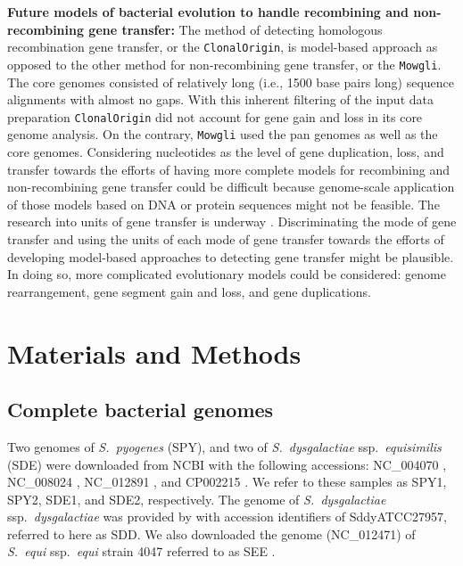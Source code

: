 \documentclass[english]{article}
\begin{document}
\textbf{Future models of bacterial evolution to handle recombining and
non-recombining gene transfer:}
The method of detecting homologous recombination gene transfer, or the
\texttt{ClonalOrigin}, is model-based approach as opposed to the other method
for non-recombining gene transfer, or the \texttt{Mowgli}.  The core genomes consisted of
relatively long (i.e., 1500 base pairs long) sequence alignments with almost no
gaps. With this inherent filtering of the input data preparation
\texttt{ClonalOrigin} did not account for gene gain and loss in its core genome
analysis. On the contrary, \texttt{Mowgli} used the pan genomes as well as the core
genomes.  Considering nucleotides as the level of gene duplication, loss, and
transfer towards the efforts of having more complete models for recombining and
non-recombining gene transfer could be difficult because genome-scale
application of those models based on DNA or protein sequences might not be
feasible.  The research into units of gene transfer is underway
\citep[e.g.,][]{Chan2009a}. Discriminating the mode of gene transfer and using
the units of each mode of gene transfer towards the efforts of developing
model-based approaches to detecting gene transfer might be plausible. In doing
so, more complicated evolutionary models could be considered: genome
rearrangement, gene segment gain and loss, and gene duplications. 


\section{Materials and Methods}

\subsection{Complete bacterial genomes}

Two genomes of \textit{S.\ pyogenes} (SPY), and two of \textit{S.\ dysgalactiae}
ssp.\textit{\ equisimilis} (SDE) were downloaded from NCBI with the following
accessions: NC\_004070 \citep{Beres2002}, NC\_008024 \citep{Beres2006},
NC\_012891 \citep{Shimomura2011}, and CP002215 \citep{Suzuki2011}. We refer to
these samples as SPY1, SPY2, SDE1, and SDE2, respectively. The genome of
\textit{S.\ dysgalactiae} ssp.\textit{\ dysgalactiae} was provided by
\citet{Suzuki2011} with accession identifiers of SddyATCC27957, referred to here
as SDD. We also downloaded the genome (NC\_012471) of \textit{S.\ equi}
ssp.\textit{\ equi} strain 4047 referred to as SEE \citep{Holden2009}.
\end{document}
